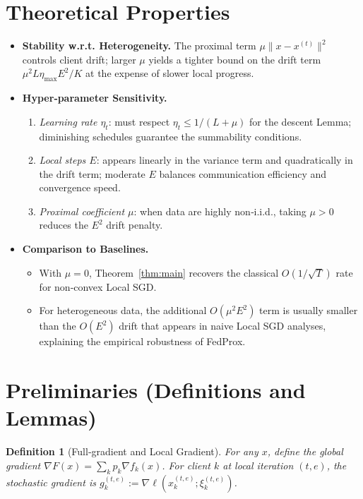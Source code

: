 \documentclass{article}
\newtheorem{definition}{Definition}
\begin{document}
\section*{Theoretical Properties}
\begin{itemize}
\item \textbf{Stability w.r.t. Heterogeneity.} The proximal term $\mu\|x-x^{(t)}\|^2$ controls client drift; larger $\mu$ yields a tighter bound on the drift term $ \mu^2 L\eta_{\max}E^2/K$ at the expense of slower local progress.
\item \textbf{Hyper‑parameter Sensitivity.}
    \begin{enumerate}[label=(\alph*)]
        \item \emph{Learning rate $\eta_t$}: must respect $\eta_t\le 1/(L+\mu)$ for the descent Lemma; diminishing schedules guarantee the summability conditions.
        \item \emph{Local steps $E$}: appears linearly in the variance term and quadratically in the drift term; moderate $E$ balances communication efficiency and convergence speed.
        \item \emph{Proximal coefficient $\mu$}: when data are highly non‑i.i.d., taking $\mu>0$ reduces the $E^2$ drift penalty.
    \end{enumerate}
\item \textbf{Comparison to Baselines.}
    \begin{itemize}
        \item With $\mu=0$, Theorem~\ref{thm:main} recovers the classical $O(1/\sqrt{T})$ rate for non‑convex Local SGD.
        \item For heterogeneous data, the additional $O(\mu^2E^2)$ term is usually smaller than the $O(E^2)$ drift that appears in naive Local SGD analyses, explaining the empirical robustness of FedProx.
    \end{itemize}
\end{itemize}

\section*{Preliminaries (Definitions and Lemmas)}
\begin{definition}[Full‑gradient and Local Gradient]
For any $x$, define the global gradient $\nabla F(x)=\sum_{k}p_k\nabla f_k(x)$.
For client $k$ at local iteration $(t,e)$, the stochastic gradient is
$g_{k}^{(t,e)}:=\nabla\ell(x_{k}^{(t,e)};\xi_{k}^{(t,e)})$.
\end{definition}
\end{document}
